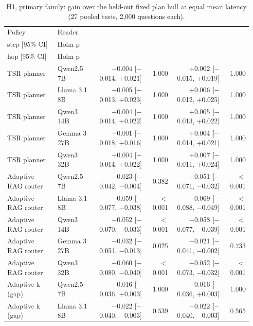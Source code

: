 \begin{table}[t]
\centering\small
\setlength{\tabcolsep}{4pt}
\caption{H1, primary family: gain over the held-out fixed plan hull at equal mean latency (27 pooled tests, 2,000 questions each).}
\label{tab:h1}
\begin{tabular*}{\linewidth}{@{\extracolsep{\fill}}llrrrr}
\toprule
Policy & Reader & \begin{tabular}[b]{@{}r@{}}Gain, single \\ step [95\% CI]\end{tabular} & Holm p & \begin{tabular}[b]{@{}r@{}}Gain, with two \\ hop [95\% CI]\end{tabular} & Holm p  \\
\midrule
TSR planner & Qwen2.5 7B & +0.004 [$-$0.014, +0.021] & 1.000 & +0.002 [$-$0.015, +0.019] & 1.000 \\
TSR planner & Llama 3.1 8B & +0.005 [$-$0.013, +0.023] & 1.000 & +0.006 [$-$0.012, +0.025] & 1.000 \\
TSR planner & Qwen3 14B & +0.004 [$-$0.014, +0.022] & 1.000 & +0.005 [$-$0.013, +0.022] & 1.000 \\
TSR planner & Gemma 3 27B & $-$0.001 [$-$0.018, +0.016] & 1.000 & +0.004 [$-$0.014, +0.021] & 1.000 \\
TSR planner & Qwen3 32B & +0.004 [$-$0.014, +0.022] & 1.000 & +0.007 [$-$0.011, +0.024] & 1.000 \\
Adaptive RAG router & Qwen2.5 7B & $-$0.023 [$-$0.042, $-$0.004] & 0.382 & $-$0.051 [$-$0.071, $-$0.032] & $<$0.001 \\
Adaptive RAG router & Llama 3.1 8B & $-$0.059 [$-$0.077, $-$0.038] & $<$0.001 & $-$0.069 [$-$0.088, $-$0.049] & $<$0.001 \\
Adaptive RAG router & Qwen3 14B & $-$0.052 [$-$0.070, $-$0.033] & $<$0.001 & $-$0.058 [$-$0.077, $-$0.039] & $<$0.001 \\
Adaptive RAG router & Gemma 3 27B & $-$0.032 [$-$0.051, $-$0.013] & 0.025 & $-$0.021 [$-$0.041, $-$0.002] & 0.733 \\
Adaptive RAG router & Qwen3 32B & $-$0.060 [$-$0.080, $-$0.040] & $<$0.001 & $-$0.052 [$-$0.073, $-$0.032] & $<$0.001 \\
Adaptive k (gap) & Qwen2.5 7B & $-$0.016 [$-$0.036, +0.003] & 1.000 & $-$0.016 [$-$0.036, +0.003] & 1.000 \\
Adaptive k (gap) & Llama 3.1 8B & $-$0.022 [$-$0.040, $-$0.003] & 0.539 & $-$0.022 [$-$0.040, $-$0.003] & 0.565 \\

\end{tabular*}
\end{table}
